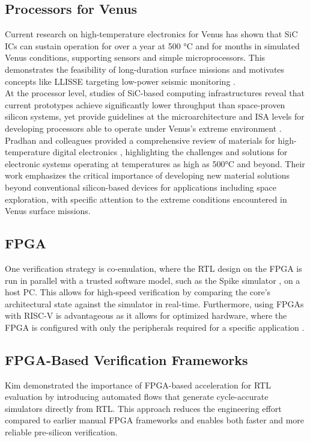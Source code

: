 \documentclass[10pt,twocolumn]{article}
\begin{document}
\subsection{Processors for Venus}
Current research on high-temperature electronics for Venus has shown that SiC ICs can sustain operation for over a year at 500 °C and for months in simulated Venus conditions, supporting sensors and simple microprocessors. This demonstrates the feasibility of long-duration surface missions and motivates concepts like LLISSE targeting low-power seismic monitoring \cite{kim2022sic}. \\
At the processor level, studies of SiC-based computing infrastructures reveal that current prototypes achieve significantly lower throughput than space-proven silicon systems, yet provide guidelines at the microarchitecture and ISA levels for developing processors able to operate under Venus's extreme environment \cite{kremic2021temperature}.\\
Pradhan and colleagues provided a comprehensive review of materials for high-temperature digital electronics \cite{pradhan2024materials}, highlighting the challenges and solutions for electronic systems operating at temperatures as high as 500°C and beyond. Their work emphasizes the critical importance of developing new material solutions beyond conventional silicon-based devices for applications including space exploration, with specific attention to the extreme conditions encountered in Venus surface missions.

\subsection{FPGA}
One verification strategy is co-emulation, where the RTL design on the FPGA is run in parallel with a trusted software model, such as the Spike simulator \cite{moreno2023fpga}, on a host PC. This allows for high-speed verification by comparing the core's architectural state against the simulator in real-time. Furthermore, using FPGAs with RISC-V is advantageous as it allows for optimized hardware, where the FPGA is configured with only the peripherals required for a specific application \cite{efinix2023riscv}.

\subsection{FPGA-Based Verification Frameworks}

Kim \cite{kim2019fpga} demonstrated the importance of FPGA-based acceleration for RTL evaluation by introducing automated flows that generate cycle-accurate simulators directly from RTL. This approach reduces the engineering effort compared to earlier manual FPGA frameworks and enables both faster and more reliable pre-silicon verification. 
\end{document}
